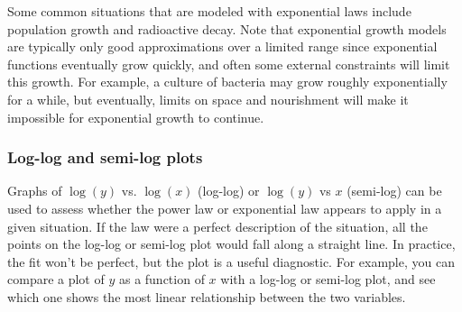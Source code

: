 \documentclass[twoside]{book}\usepackage[]{graphicx}\usepackage[]{xcolor}
\newcounter{example}[section]
\begin{document}
Some common situations that are modeled with exponential laws include
population growth and radioactive decay.  Note that exponential growth models
are typically only good approximations over a limited range since exponential
functions eventually grow quickly, and often some external constraints will
limit this growth.  For example, a culture of bacteria may grow roughly
exponentially for a while, but eventually, limits on space and nourishment will
make it impossible for exponential growth to continue.

\subsubsection{Log-log and semi-log plots}

Graphs of $\log(y)$ vs. $\log(x)$ (log-log) or $\log(y)$ vs $x$ (semi-log)
can be used to assess whether the power law or exponential law appears to apply
in a given situation.  If the law were a perfect description of the situation,
all the points on the log-log or semi-log plot would fall along a straight line.
In practice, the fit won't be perfect, but the plot is a useful diagnostic.  For example, you can compare a plot of $y$ as a function of $x$ with a log-log or semi-log plot, and see which one shows the most linear relationship between the two variables.
\end{document}
